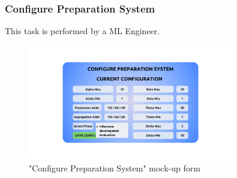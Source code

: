 \subsubsection{Configure Preparation System}

This task is performed by a ML Engineer.

\begin{figure}[H]
\centering
\includegraphics[width=0.8\textwidth]{figures/ui_configure_preparation.png}
\caption{"Configure Preparation System" mock-up form}
\end{figure}

